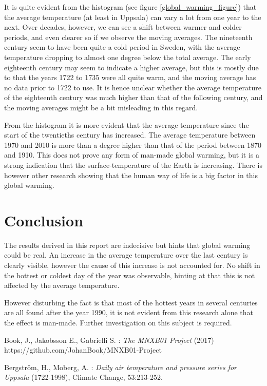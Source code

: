 \documentclass[a4paper]{article}
\begin{document}
It is quite evident from the histogram (see figure \ref{global_warming_figure}) that the average temperature (at least in Uppsala) can vary a lot from one year to the next. Over decades, however, we can see a shift between warmer and colder periods, and even clearer so if we observe the moving averages. The nineteenth century seem to have been quite a cold period in Sweden, with the average temperature dropping to almost one degree below the total average. The early eighteenth century may seem to indicate a higher average, but this is mostly due to that the years 1722 to 1735 were all quite warm, and the moving average has no data prior to 1722 to use. It is hence unclear whether the average temperature of the eighteenth century was much higher than that of the following century, and the moving averages might be a bit misleading in this regard.

\medskip
\medskip
From the histogram it is more evident that the average temperature since the start of the twentieths century has increased. The average temperature between 1970 and 2010 is more than a degree higher than that of the period between 1870 and 1910. This does not prove any form of man-made global warming, but it is a strong indication that the surface-temperature of the Earth is increasing. There is however other research showing that the human way of life is a big factor in this global warming.

\section{Conclusion}



The results derived in this report are indecisive but hints that global warming could be real. An increase in the average temperature over the last century is clearly visible, however the cause of this increase is not accounted for. No shift in the hottest or coldest day of the year was observable, hinting at that this is not affected by the average temperature.

\medskip
\medskip
However disturbing the fact is that most of the hottest years in several centuries are all found after the year 1990, it is not evident from this research alone that the effect is man-made. Further investigation on this subject is required.

\begin{thebibliography}{9}
Book, J., Jakobsson E., Gabrielli S. : 
\textit{The MNXB01 Project} (2017)\\
https://github.com/JohanBook/MNXB01-Project

Bergström, H., Moberg, A. :
    \textit{Daily air temperature and pressure series for Uppsala} (1722-1998), 
    Climate Change, 53:213-252.

\end{thebibliography}
\end{document}
